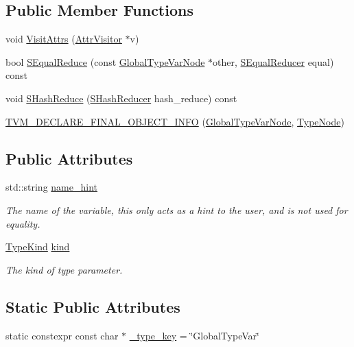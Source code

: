\subsection*{Public Member Functions}
\begin{DoxyCompactItemize}
\item 
void \hyperlink{classtvm_1_1GlobalTypeVarNode_ad0db6587dd6fb6be938680d52d28d9ac}{Visit\+Attrs} (\hyperlink{classtvm_1_1AttrVisitor}{Attr\+Visitor} $\ast$v)
\item 
bool \hyperlink{classtvm_1_1GlobalTypeVarNode_a5c1bfa6eb261fff74b4419de27520497}{S\+Equal\+Reduce} (const \hyperlink{classtvm_1_1GlobalTypeVarNode}{Global\+Type\+Var\+Node} $\ast$other, \hyperlink{classtvm_1_1SEqualReducer}{S\+Equal\+Reducer} equal) const 
\item 
void \hyperlink{classtvm_1_1GlobalTypeVarNode_aa885581e4b82ff1cb8b0e77372b462f1}{S\+Hash\+Reduce} (\hyperlink{classtvm_1_1SHashReducer}{S\+Hash\+Reducer} hash\+\_\+reduce) const 
\item 
\hyperlink{classtvm_1_1GlobalTypeVarNode_aa040d458ec687c7e2fd9b73a2528adc9}{T\+V\+M\+\_\+\+D\+E\+C\+L\+A\+R\+E\+\_\+\+F\+I\+N\+A\+L\+\_\+\+O\+B\+J\+E\+C\+T\+\_\+\+I\+N\+FO} (\hyperlink{classtvm_1_1GlobalTypeVarNode}{Global\+Type\+Var\+Node}, \hyperlink{classtvm_1_1TypeNode}{Type\+Node})
\end{DoxyCompactItemize}
\subsection*{Public Attributes}
\begin{DoxyCompactItemize}
\item 
std\+::string \hyperlink{classtvm_1_1GlobalTypeVarNode_a9a4ba707c819bf2e29d9b58c72047a1b}{name\+\_\+hint}
\begin{DoxyCompactList}\small\item\em The name of the variable, this only acts as a hint to the user, and is not used for equality. \end{DoxyCompactList}\item 
\hyperlink{namespacetvm_acd267f8d7f55da6ac681239831963279}{Type\+Kind} \hyperlink{classtvm_1_1GlobalTypeVarNode_a335e232894a68cc1e0ecb766bf4053c7}{kind}
\begin{DoxyCompactList}\small\item\em The kind of type parameter. \end{DoxyCompactList}\end{DoxyCompactItemize}
\subsection*{Static Public Attributes}
\begin{DoxyCompactItemize}
\item 
static constexpr const char $\ast$ \hyperlink{classtvm_1_1GlobalTypeVarNode_af82257e44561e9f8267bacfda2ecc854}{\+\_\+type\+\_\+key} = \char`\"{}Global\+Type\+Var\char`\"{}
\end{DoxyCompactItemize}


